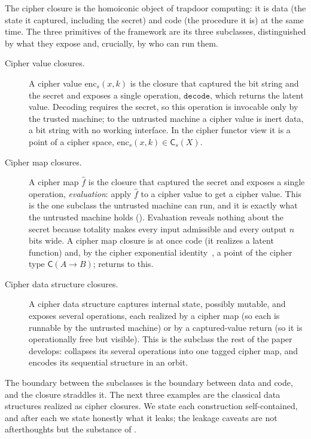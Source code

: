 \documentclass[11pt]{article}
\theoremstyle{definition}
\theoremstyle{plain}
\theoremstyle{definition}
\theoremstyle{remark}
\newcommand{\enc}{\mathrm{enc}}
\newcommand{\fhat}{\hat{f}}
\newcommand{\cipher}[1]{\mathsf{C}(#1)}
\newcommand{\cipherS}[2]{\mathsf{C}_{#2}(#1)}
\begin{document}
The cipher closure is the homoiconic object of trapdoor computing: it
is data (the state it captured, including the secret) and code (the
procedure it is) at the same time. The three primitives of the
framework are its three subclasses, distinguished by what they expose
and, crucially, by who can run them.

\begin{description}
\item[Cipher value closures.] A cipher value $\enc_s(x, k)$ is the
  closure that captured the bit string and the secret and exposes a
  single operation, $\texttt{decode}$, which returns the latent value.
  Decoding requires the secret, so this operation is invocable only by
  the trusted machine; to the untrusted machine a cipher value is inert
  data, a bit string with no working interface. In the cipher functor
  view it is a point of a cipher space, $\enc_s(x,k) \in \cipherS{X}{s}$.

\item[Cipher map closures.] A cipher map $\fhat$ is the closure that
  captured the secret and exposes a single operation,
  \emph{evaluation}: apply $\fhat$ to a cipher value to get a cipher
  value. This is the one subclass the untrusted machine can run, and
  it is exactly what the untrusted machine holds
  (). Evaluation reveals nothing about the secret
  because totality makes every input admissible and every output
  $n$ bits wide. A cipher map closure is at once code (it realizes a
  latent function) and, by the cipher exponential
  identity~\cite[Prop.~4.3]{towell2026algebraic}, a point of the cipher
  type $\cipher{A \to B}$;  returns to this.

\item[Cipher data structure closures.] A cipher data structure
  captures internal state, possibly mutable, and exposes several
  operations, each realized by a cipher map (so each is runnable by the
  untrusted machine) or by a captured-value return (so it is
  operationally free but visible). This is the subclass the rest of the
  paper develops:  collapses its several operations
  into one tagged cipher map, and  encodes
  its sequential structure in an orbit.
\end{description}

The boundary between the subclasses is the boundary between data and
code, and the closure straddles it. The next three examples are the
classical data structures realized as cipher closures. We state each
construction self-contained, and after each we state honestly what it
leaks; the leakage caveats are not afterthoughts but the substance of
.
\end{document}
